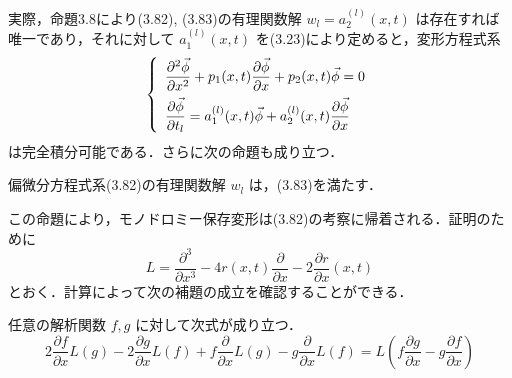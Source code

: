 \begin{story}
実際，命題3.8により(3.82), (3.83)の有理関数解 $w_l = a_2^{(l)}(x,t)$ は存在すれば唯一であり，それに対して $a_1^{(l)}(x,t)$ を(3.23)により定めると，変形方程式系
\begin{equation}
\left\{
\begin{array}{l}
    \displaystyle \frac{\partial^2 \vec{\phi}}{\partial x^2} + p_1(x,t)\frac{\partial \vec{\phi}}{\partial x} + p_2(x,t)\vec{\phi} = 0 \vspace{0.5em} \\
    \displaystyle \frac{\partial \vec{\phi}}{\partial t_l} = a_1^{(l)}(x,t)\vec{\phi} + a_2^{(l)}(x,t)\frac{\partial \vec{\phi}}{\partial x}
\end{array}
\right. \label{eq:3.20}
\end{equation}
は完全積分可能である．さらに次の命題も成り立つ．

\begin{proposition}[3.14]
偏微分方程式系(3.82)の有理関数解 $w_l$ は，(3.83)を満たす．
\end{proposition}

この命題により，モノドロミー保存変形は(3.82)の考察に帰着される．証明のために
\begin{equation*}
    L = \frac{\partial^3}{\partial x^3} - 4r(x,t)\frac{\partial}{\partial x} - 2\frac{\partial r}{\partial x}(x,t)
\end{equation*}
とおく．計算によって次の補題の成立を確認することができる．

\begin{lemma}[3.6]
任意の解析関数 $f,g$ に対して次式が成り立つ．
\begin{equation*}
    2\frac{\partial f}{\partial x}L(g) - 2\frac{\partial g}{\partial x}L(f) + f\frac{\partial}{\partial x}L(g) - g\frac{\partial}{\partial x}L(f) = L\left( f\frac{\partial g}{\partial x} - g\frac{\partial f}{\partial x} \right)
\end{equation*}
\end{lemma}


\end{story}

